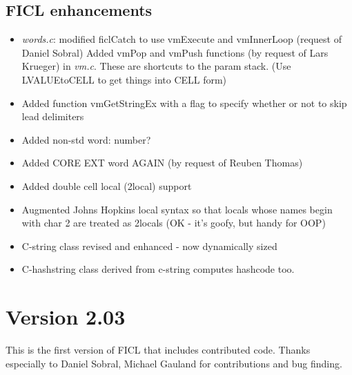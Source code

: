 \subsection*{FICL enhancements}
\begin{itemize}[noitemsep]
	\item \textit{words.c}: modified ficlCatch to use vmExecute and
	vmInnerLoop (request of Daniel Sobral) Added vmPop and vmPush
	functions (by request of Lars Krueger) in \textit{vm.c}. These
	are shortcuts to the param stack. (Use LVALUEtoCELL to get
	things into CELL form)

	\item Added function vmGetStringEx with a flag to specify
	whether or not to skip lead delimiters

	\item Added non-std word: number?

	\item Added CORE EXT word AGAIN (by request of Reuben Thomas)

	\item Added double cell local (2local) support

	\item Augmented Johns Hopkins local syntax so that locals whose
	names begin with char 2 are treated as 2locals (OK - it's goofy,
	but handy for OOP)

	\item C-string class revised and enhanced - now dynamically
	sized

	\item C-hashstring class derived from c-string computes hashcode
	too.
\end{itemize}


\section*{Version 2.03}
This is the first version of FICL that includes contributed code. Thanks
especially to Daniel Sobral, Michael Gauland for contributions and bug
finding.

